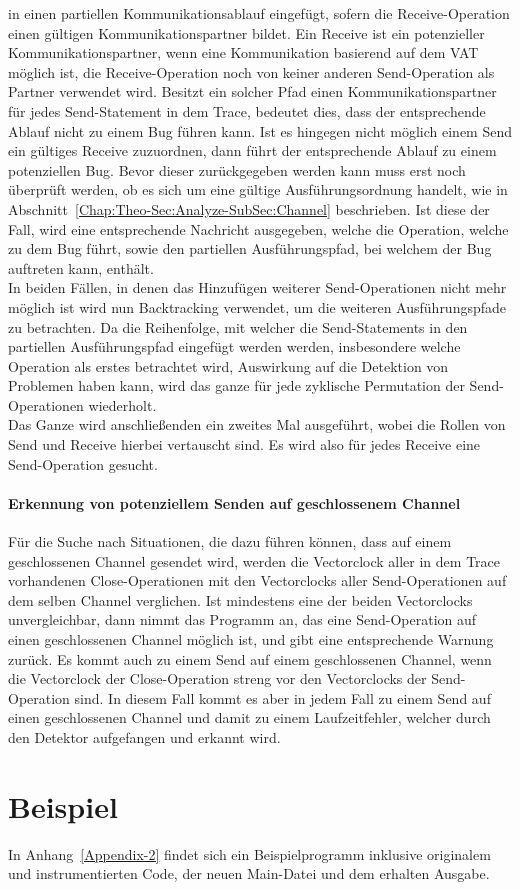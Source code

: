 in einen partiellen Kommunikationsablauf eingefügt, sofern die 
Receive-Operation einen gültigen Kommunikationspartner bildet. Ein Receive 
ist ein potenzieller Kommunikationspartner, wenn eine Kommunikation 
basierend auf dem VAT möglich ist, die Receive-Operation noch von keiner 
anderen Send-Operation als Partner verwendet wird. Besitzt ein solcher Pfad 
einen Kommunikationspartner für jedes Send-Statement in dem Trace, bedeutet dies, 
dass der entsprechende Ablauf nicht zu einem Bug führen kann. Ist es hingegen 
nicht möglich einem Send ein gültiges Receive zuzuordnen, dann führt der 
entsprechende Ablauf zu einem potenziellen Bug. Bevor dieser zurückgegeben 
werden kann muss erst noch überprüft werden, ob es sich um eine 
gültige Ausführungsordnung handelt, wie in Abschnitt~\ref{Chap:Theo-Sec:Analyze-SubSec:Channel} 
beschrieben. Ist diese der Fall, wird eine entsprechende Nachricht ausgegeben, 
welche die Operation, welche zu dem Bug führt, sowie den partiellen
Ausführungspfad, bei welchem der Bug auftreten kann, enthält.\\In beiden 
Fällen, in denen das Hinzufügen weiterer Send-Operationen nicht mehr möglich ist 
wird nun Backtracking verwendet, um die weiteren Ausführungspfade zu betrachten.
Da die Reihenfolge, mit welcher die Send-Statements in den partiellen 
Ausführungspfad eingefügt werden werden, insbesondere welche Operation als erstes 
betrachtet wird, Auswirkung auf die Detektion von Problemen haben kann, 
wird das ganze für jede zyklische Permutation der Send-Operationen wiederholt. \\
Das Ganze wird anschließenden ein zweites Mal ausgeführt, wobei die Rollen 
von Send und Receive hierbei vertauscht sind. Es wird also für jedes Receive 
eine Send-Operation gesucht. 

\paragraph{Erkennung von potenziellem Senden auf geschlossenem Channel}
Für die Suche nach Situationen, die dazu führen können, dass auf einem 
geschlossenen Channel gesendet wird, werden die Vectorclock aller in dem 
Trace vorhandenen Close-Operationen mit den Vectorclocks aller Send-Operationen
auf dem selben Channel verglichen. Ist mindestens eine der beiden Vectorclocks 
unvergleichbar, dann nimmt das Programm an, das eine Send-Operation auf 
einen geschlossenen Channel möglich ist, und gibt eine entsprechende 
Warnung zurück. Es kommt auch zu einem Send auf einem geschlossenen Channel, 
wenn die Vectorclock der Close-Operation streng vor den Vectorclocks 
der Send-Operation sind. In diesem Fall kommt es aber in jedem Fall zu einem 
Send auf einen geschlossenen Channel und damit zu einem Laufzeitfehler, 
welcher durch den Detektor aufgefangen und erkannt wird.


\section{Beispiel}
In Anhang~\ref{Appendix-2} findet sich ein Beispielprogramm inklusive
originalem und instrumentierten Code, der neuen Main-Datei und
dem erhalten Ausgabe. 